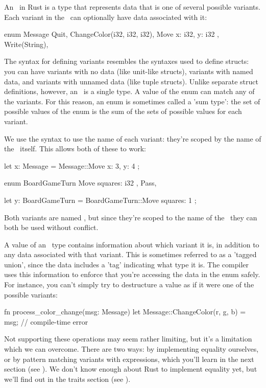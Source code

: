 An \enum\ in Rust is a type that represents data that is one of several possible variants. Each variant in the \enum\ can optionally 
have data associated with it:

\begin{rustc}
enum Message {
    Quit,
    ChangeColor(i32, i32, i32),
    Move { x: i32, y: i32 },
    Write(String),
}
\end{rustc}

The syntax for defining variants resembles the syntaxes used to define structs: you can have variants with no data (like unit-like 
structs), variants with named data, and variants with unnamed data (like tuple structs). Unlike separate struct definitions, however, 
an \enum\ is a single type. A value of the enum can match any of the variants. For this reason, an enum is sometimes called a 
'sum type': the set of possible values of the enum is the sum of the sets of possible values for each variant.

\blank

We use the \code{::} syntax to use the name of each variant: they're scoped by the name of the \enum\ itself. This allows both of 
these to work:

\begin{rustc}
let x: Message = Message::Move { x: 3, y: 4 };

enum BoardGameTurn {
    Move { squares: i32 },
    Pass,
}

let y: BoardGameTurn = BoardGameTurn::Move { squares: 1 };
\end{rustc}

Both variants are named , but since they're scoped to the name of the \enum\, they can both be used without conflict.

\blank

A value of an \enum\ type contains information about which variant it is, in addition to any data associated with that variant. This 
is sometimes referred to as a 'tagged union', since the data includes a 'tag' indicating what type it is. The compiler uses this 
information to enforce that you're accessing the data in the enum safely. For instance, you can't simply try to destructure a value 
as if it were one of the possible variants:

\begin{rustc}
fn process_color_change(msg: Message) {
    let Message::ChangeColor(r, g, b) = msg; // compile-time error
}
\end{rustc}

Not supporting these operations may seem rather limiting, but it's a limitation which we can overcome. There are two ways: by 
implementing equality ourselves, or by pattern matching variants with  expressions, which you'll learn in the next section 
(see ). We don't know enough about Rust to implement equality yet, but we'll find out in the traits section 
(see ).

